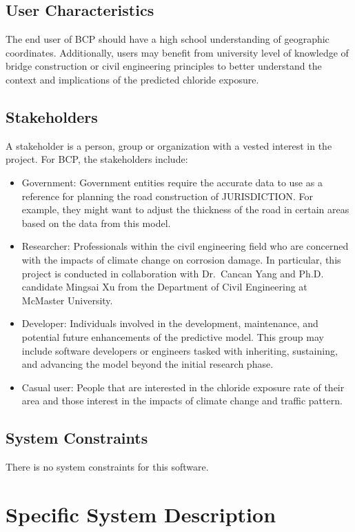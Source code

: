 \documentclass[12pt]{article}
\begin{document}
\subsection{User Characteristics} \label{SecUserCharacteristics}
The end user of BCP should have a high school understanding of geographic coordinates. Additionally, users may benefit from university level of knowledge of bridge construction or civil engineering principles to better understand the context and implications of the predicted chloride exposure.

\subsection{Stakeholders} \label{Stakeholders}
 A stakeholder is a person, group or organization with a vested interest in the project. For BCP, the stakeholders include:

\begin{itemize}
\item Government: Government entities require the accurate data to use as a reference for planning the road construction of JURISDICTION. For example, they might want to adjust the thickness of the road in certain areas based on the data from this model.
\item Researcher: Professionals within the civil engineering field who are concerned with the impacts of climate change on corrosion damage. In particular, this project is conducted in collaboration with Dr.\ Cancan Yang and Ph.D. candidate Mingsai Xu from the Department of Civil Engineering at McMaster University.
\item Developer: Individuals involved in the development, maintenance, and potential future enhancements of the predictive model. This group may include software developers or engineers tasked with inheriting, sustaining, and advancing the model beyond the initial research phase.
\item Casual user: People that are interested in the chloride exposure rate of their area and those interest in the impacts of climate change and traffic pattern. 
\end{itemize}


\subsection{System Constraints}
There is no system constraints for this software.
  
\section{Specific System Description}
\end{document}
